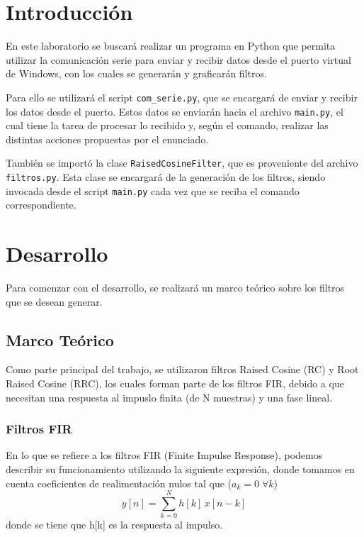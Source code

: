 \tableofcontents   %
\newpage

\section{Introducción}
En este laboratorio se buscará realizar un programa en Python que permita utilizar la comunicación serie
para enviar y recibir datos desde el puerto virtual de Windows, con los cuales se generarán y graficarán filtros.

Para ello se utilizará el script \texttt{com\_serie.py}, que se encargará de enviar y recibir los datos desde el puerto.
Estos datos se enviarán hacia el archivo \texttt{main.py}, el cual tiene la tarea de procesar lo recibido y, según el comando,
realizar las distintas acciones propuestas por el enunciado.

También se importó la clase \texttt{RaisedCosineFilter}, que es proveniente del archivo \texttt{filtros.py}. Esta clase se encargará de la generación de los filtros, siendo invocada
desde el script \texttt{main.py} cada vez que se reciba el comando correspondiente.

\section{Desarrollo}
Para comenzar con el desarrollo, se realizará un marco teórico sobre los filtros que se desean generar.
\subsection{Marco Teórico}
Como parte principal del trabajo, se utilizaron filtros Raised Cosine (RC)
y Root Raised Cosine (RRC), los cuales forman parte de los filtros FIR, debido a que necesitan una respuesta al impuslo finita (de N muestras) y una fase lineal.
\subsubsection{Filtros FIR}
    En lo que se refiere a los filtros FIR (Finite Impulse Response), podemos describir su funcionamiento utilizando la siguiente expresión,
    donde tomamos en cuenta coeficientes de realimentación nulos tal que
    ($a_k = 0 \; \forall k$)
    \begin{equation}
        y[n] = \sum_{k=0}^{N} h[k] \, x[n-k]
        \label{eq:fir}
    \end{equation}
    donde se tiene que h[k] es la respuesta al impulso.

